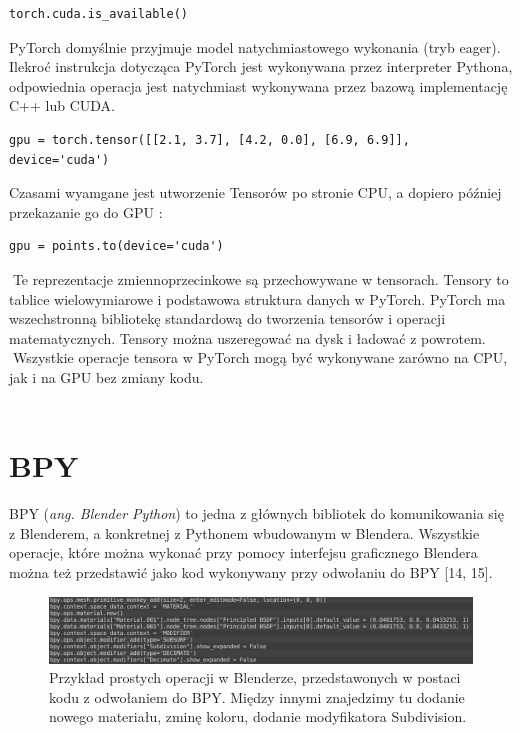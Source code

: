 \documentclass[openright]{xmgr}
\begin{document}
\begin{lstlisting}
torch.cuda.is_available()
\end{lstlisting}


PyTorch domyślnie przyjmuje model natychmiastowego wykonania (tryb eager).
Ilekroć instrukcja dotycząca PyTorch jest wykonywana przez interpreter Pythona, odpowiednia operacja jest natychmiast wykonywana przez bazową implementację C++ lub CUDA. 


\begin{lstlisting}
gpu = torch.tensor([[2.1, 3.7], [4.2, 0.0], [6.9, 6.9]], device='cuda')
\end{lstlisting}

Czasami wyamgane jest utworzenie Tensorów po stronie CPU, a dopiero później przekazanie go do GPU :

\begin{lstlisting}
gpu = points.to(device='cuda')
\end{lstlisting}



􏰹Te reprezentacje zmiennoprzecinkowe są przechowywane w tensorach. Tensory to tablice wielowymiarowe i podstawowa struktura danych w PyTorch. PyTorch ma wszechstronną bibliotekę standardową do tworzenia tensorów i operacji matematycznych. Tensory można uszeregować na dysk i ładować z powrotem.
􏰹Wszystkie operacje tensora w PyTorch mogą być wykonywane zarówno na CPU, jak i na GPU bez zmiany kodu.
\\
\\
  \section{BPY\label{s:dsssl}}
  
  \indent \indent  BPY (\textit{ang. Blender Python}) to jedna z głównych bibliotek do komunikowania się z Blenderem, a konkretnej z Pythonem wbudowanym w Blendera. Wszystkie operacje, które można wykonać przy pomocy interfejsu graficznego Blendera można też przedstawić jako kod wykonywany przy odwołaniu do BPY [14, 15].
  
  
  \begin{figure}[!tbh]
\centering
\includegraphics[width=1.1\hsize]{fig/8}
\caption{Przykład prostych operacji w Blenderze, przedstawonych w postaci kodu z odwołaniem do BPY. Między innymi znajedzimy tu dodanie nowego materiału, zminę koloru, dodanie modyfikatora Subdivision.\label{RYS.3}}
\end{figure}
  
\end{document}
